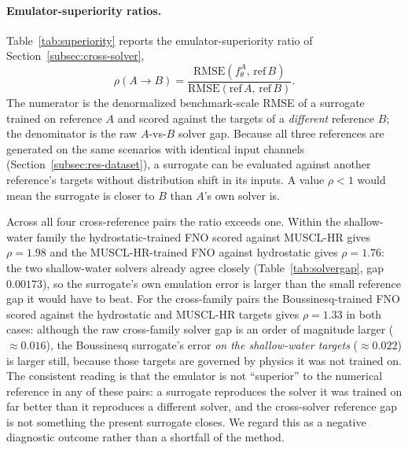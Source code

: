 \paragraph{Emulator-superiority ratios.}
Table~\ref{tab:superiority} reports the emulator-superiority ratio of Section~\ref{subsec:cross-solver},
\[
    \rho(A \rightarrow B) =
    \frac{\mathrm{RMSE}(f_\theta ^ A,\, \mathrm{ref}\, B)}
         {\mathrm{RMSE}(\mathrm{ref}\, A,\, \mathrm{ref}\, B)} .
\]
The numerator is the denormalized benchmark-scale RMSE of a surrogate trained on reference $A$ and scored against the targets of a \emph{different} reference $B$; the denominator is the raw $A$-vs-$B$ solver gap. Because all three references are generated on the same scenarios with identical input channels (Section~\ref{subsec:res-dataset}), a surrogate can be evaluated against another reference's targets without distribution shift in its inputs. A value $\rho<1$ would mean the surrogate is closer to $B$ than $A$'s own solver is.

Across all four cross-reference pairs the ratio exceeds one. Within the shallow-water family the hydrostatic-trained FNO scored against MUSCL-HR gives $\rho = 1.98$ and the MUSCL-HR-trained FNO against hydrostatic gives $\rho = 1.76$: the two shallow-water solvers already agree closely (Table~\ref{tab:solvergap}, gap $0.00173$), so the surrogate's own emulation error is larger than the small reference gap it would have to beat. For the cross-family pairs the Boussinesq-trained FNO scored against the hydrostatic and MUSCL-HR targets gives $\rho=1.33$ in both cases: although the raw cross-family solver gap is an order of magnitude larger ($\approx 0.016$), the Boussinesq surrogate's error \emph{on the shallow-water targets} ($\approx 0.022$) is larger still, because those targets are governed by physics it was not trained on. The consistent reading is that the emulator is not ``superior'' to the numerical reference in any of these pairs: a surrogate reproduces the solver it was trained on far better than it reproduces a different solver, and the cross-solver reference gap is not something the present surrogate closes. We regard this as a negative diagnostic outcome rather than a shortfall of the method.

